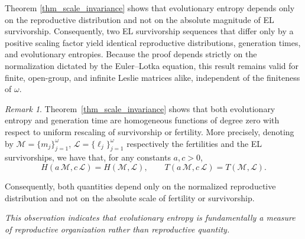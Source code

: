 \documentclass[10pt,a4paper]{amsart}
\theoremstyle{definition}
\theoremstyle{remark}
\newtheorem{rem}[thm]{Remark}
\numberwithin{equation}{section}
\begin{document}
Theorem \ref{thm_scale_invariance} shows that evolutionary entropy
depends only on the reproductive distribution and not on
the absolute magnitude of EL survivorship.
Consequently, two EL survivorship sequences that differ only by a positive scaling factor yield identical reproductive distributions, generation times, and evolutionary entropies.
Because the proof depends strictly on the normalization dictated by the Euler–Lotka equation, this result remains valid for finite, open-group, and infinite Leslie matrices alike, independent of the finiteness of \(\omega\).





\begin{rem}
Theorem~\ref{thm_scale_invariance} shows that both evolutionary
entropy and generation time are homogeneous functions of degree zero with
respect to uniform rescaling of survivorship or fertility. More
precisely, denoting by $\mathcal{M} = \{m_j\}_{j=1}^\omega$, 
$\mathcal{L} = \{\ell_j\}_{j=1}^\omega$ respectively the fertilities and the EL survivorships, we have that, 
for any constants \(a,c>0\),
\[
H(a\,\mathcal{M},c\,\mathcal{L})
=
H(\mathcal{M},\mathcal{L}),
\qquad
T(a\,\mathcal{M},c\,\mathcal{L})
=
T(\mathcal{M},\mathcal{L}).
\]

	
	\noindent Consequently, both quantities depend only on the normalized
reproductive distribution and not on the absolute scale of fertility
or survivorship.
\end{rem}

\emph{This observation indicates that evolutionary entropy is fundamentally
a measure of reproductive organization rather than reproductive
quantity.}




\FloatBarrier
\end{document}
